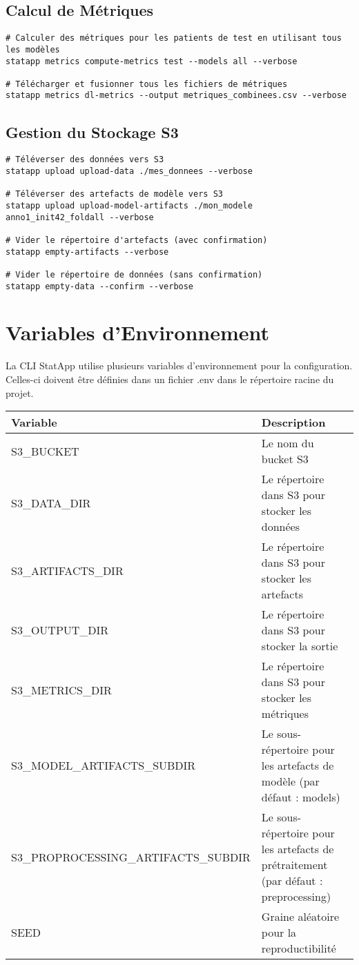 \documentclass{article}
\begin{document}
\subsection{Calcul de Métriques}
\begin{lstlisting}
# Calculer des métriques pour les patients de test en utilisant tous les modèles
statapp metrics compute-metrics test --models all --verbose

# Télécharger et fusionner tous les fichiers de métriques
statapp metrics dl-metrics --output metriques_combinees.csv --verbose
\end{lstlisting}

\subsection{Gestion du Stockage S3}
\begin{lstlisting}
# Téléverser des données vers S3
statapp upload upload-data ./mes_donnees --verbose

# Téléverser des artefacts de modèle vers S3
statapp upload upload-model-artifacts ./mon_modele anno1_init42_foldall --verbose

# Vider le répertoire d'artefacts (avec confirmation)
statapp empty-artifacts --verbose

# Vider le répertoire de données (sans confirmation)
statapp empty-data --confirm --verbose
\end{lstlisting}

\section{Variables d'Environnement}
La CLI StatApp utilise plusieurs variables d'environnement pour la configuration. Celles-ci doivent être définies dans un fichier .env dans le répertoire racine du projet.

\begin{tabulary}{\linewidth}{LL}
\toprule
\textbf{Variable} & \textbf{Description} \\
\midrule
S3\_BUCKET & Le nom du bucket S3 \\
S3\_DATA\_DIR & Le répertoire dans S3 pour stocker les données \\
S3\_ARTIFACTS\_DIR & Le répertoire dans S3 pour stocker les artefacts \\
S3\_OUTPUT\_DIR & Le répertoire dans S3 pour stocker la sortie \\
S3\_METRICS\_DIR & Le répertoire dans S3 pour stocker les métriques \\
S3\_MODEL\_ARTIFACTS\_SUBDIR & Le sous-répertoire pour les artefacts de modèle (par défaut : models) \\
S3\_PROPROCESSING\_ARTIFACTS\_SUBDIR & Le sous-répertoire pour les artefacts de prétraitement (par défaut : preprocessing) \\
SEED & Graine aléatoire pour la reproductibilité \\
\bottomrule
\end{tabulary}
\end{document}
